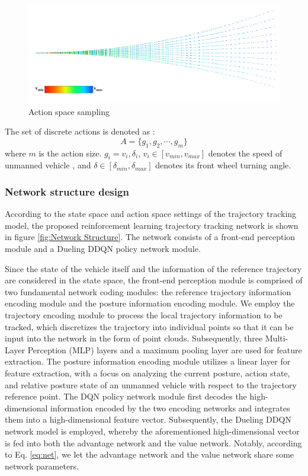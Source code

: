 \documentclass[sn-mathphys]{sn-jnl}%
\theoremstyle{thmstyleone}%
\theoremstyle{thmstyletwo}%
\theoremstyle{thmstylethree}%
\begin{document}
\begin{figure}
	\centering
	\includegraphics[width=0.9\linewidth]{ego_graph}
	\caption{Action space sampling}
	\label{fig:Ego graph}
\end{figure}

The set of discrete actions is denoted as :
\begin{equation}
A=\{g_1,g_2,\cdots,g_m\}
\end{equation}
where $ m $ is the action size. $ g_i={v_i,\delta_i } $, $ v_i\in [v_{min},v_{max}] $ denotes the speed of unmanned vehicle , and $ \delta\in [\delta_{min},\delta_{max}] $ denotes its front wheel turning angle. 

\subsubsection{Network structure design}
\label{sec:network}
According to the state space and action space settings of the trajectory tracking model, the proposed reinforcement learning trajectory tracking network is shown in figure \ref{fig:Network Structure}.
The network consists of a front-end perception module and a Dueling DDQN policy network module.

Since the state of the vehicle itself and the information of the reference trajectory are considered in the state space, the front-end perception module is comprised of two fundamental network coding modules: the reference trajectory information encoding module and the posture information encoding module. We employ the trajectory encoding module to process the local trajectory information to be tracked, which discretizes the trajectory into individual points so that it can be input into the network in the form of point clouds. Subsequently, three Multi-Layer Perception (MLP) layers and a maximum pooling layer are used for feature extraction. The posture information encoding module utilizes a linear layer for feature extraction, with a focus on analyzing the current posture, action state, and relative posture state of an unmanned vehicle with respect to the trajectory reference point.
The DQN policy network module first decodes the high-dimensional information encoded by the two encoding networks and integrates them into a high-dimensional feature vector. Subsequently, the Dueling DDQN network model is employed, whereby the aforementioned high-dimensional vector is fed into both the advantage network and the value network. Notably, according to Eq. \ref{eq:net}, we let the advantage network and the value network share some network parameters.
\end{document}
